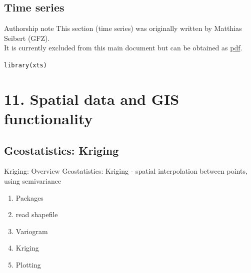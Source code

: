 \documentclass[xcolor=table,       handout,    xcolor=dvipsnames]{beamer}\usepackage[]{graphicx}\usepackage[]{color}
\makeatletter
\newcommand{\hlstd}[1]{\textcolor[rgb]{0,0,0}{#1}}
\newcommand{\hlkwd}[1]{\textcolor[rgb]{0,0,1}{#1}}
\newenvironment{kframe}{%
 \def\at@end@of@kframe{}%
 \ifinner\ifhmode%
  \def\at@end@of@kframe{\end{minipage}}%
  \begin{minipage}{\columnwidth}%
 \fi\fi%
 \def\FrameCommand##1{\hskip\@totalleftmargin \hskip-\fboxsep
 \colorbox{shadecolor}{##1}\hskip-\fboxsep
     \hskip-\linewidth \hskip-\@totalleftmargin \hskip\columnwidth}%
 \MakeFramed {\advance\hsize-\width
   \@totalleftmargin\z@ \linewidth\hsize
   \@setminipage}}%
 {\par\unskip\endMakeFramed%
 \at@end@of@kframe}
\newenvironment{knitrout}{}{} %
\makeatother
\begin{document}
\subsection{Time series}

\begin{frame}{Authorship note}
This section (time series) was originally written by Matthias Seibert (GFZ).\\
It is currently excluded from this main document but can be obtained as \href{https://dl.dropboxusercontent.com/u/4836866/R_course_Berry/RcourseBerry_Mathias.pdf}{pdf}.

\begin{knitrout}
\color{fgcolor}\begin{kframe}
\begin{alltt}
\hlkwd{library}\hlstd{(xts)}
\end{alltt}
\end{kframe}
\end{knitrout}
\end{frame}

\section{11. Spatial data and GIS functionality}

\subsection{Geostatistics: Kriging}

\begin{frame}[fragile]{Kriging: Overview}
Geostatistics: Kriging - spatial interpolation between points, using semivariance
\begin{enumerate}
\item Packages
\item read shapefile
\item Variogram
\item Kriging
\item Plotting
\end{enumerate}
\end{frame}
\end{document}
